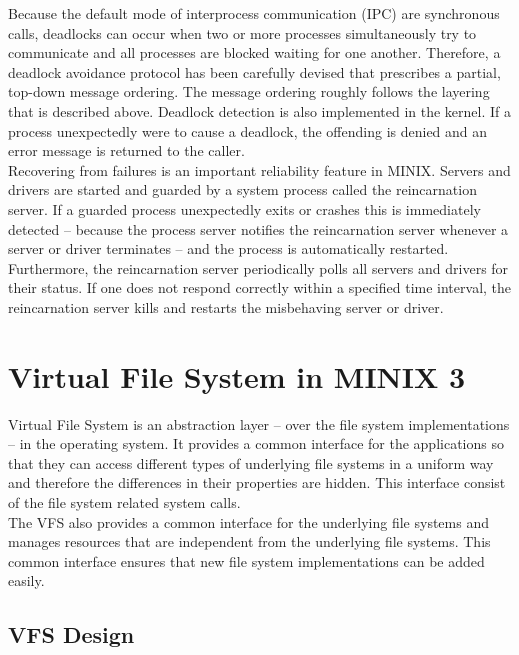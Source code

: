 Because the default mode of interprocess communication (IPC) are synchronous calls, deadlocks can occur when two or more processes simultaneously try to communicate and all processes are blocked waiting for one another. Therefore, a deadlock avoidance protocol has been carefully devised that prescribes a partial, top-down message ordering. The message ordering roughly follows the layering that is described above. Deadlock detection is also implemented in the kernel. If a process unexpectedly were to cause a deadlock, the offending is denied and an error message is returned to the caller. \\

Recovering from failures is an important reliability feature in MINIX. Servers and drivers are started and guarded by a system process called the reincarnation server. If a guarded process unexpectedly exits or crashes this is immediately detected – because the process server notifies the reincarnation server whenever a server or driver terminates – and the process is automatically restarted. Furthermore, the reincarnation server periodically polls all servers and drivers for their status. If one does not respond correctly within a specified time interval, the reincarnation server kills and restarts the misbehaving server or driver.

\section{Virtual File System in MINIX 3 \cite{vfs}}
Virtual File System is an abstraction layer – over the file system implementations – in the operating system. It provides a common interface for the applications so that they can access different types of underlying file systems in a uniform way and therefore the differences in their properties are hidden. This interface consist of the file system related system calls.\\

The VFS also provides a common interface for the underlying file systems and manages resources that are independent from the underlying file systems. This common interface ensures that new file system implementations can be added easily.

\subsection{VFS Design }

